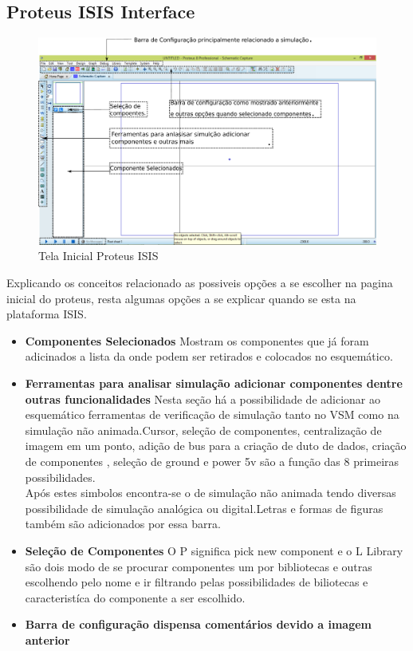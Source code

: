 \documentclass{Fabiano_file}
\begin{document}
 
\pagebreak

\subsection{Proteus ISIS Interface}

\begin{figure}[h!]
\centering
\includegraphics[width=1\textwidth]{tela_inicial_isis.pdf}
\caption{Tela Inicial Proteus ISIS}
\label{fig:tela_inicial_isis}
\end{figure}

Explicando os conceitos relacionado as possiveis opções a se escolher na pagina inicial do proteus, resta algumas opções a se explicar quando se esta na plataforma 
ISIS.

\begin{itemize}
 \item \textbf{Componentes Selecionados} Mostram os componentes que já foram adicinados a lista da onde podem ser retirados e colocados no esquemático.
 \item \textbf{Ferramentas para analisar simulação adicionar componentes dentre outras funcionalidades} Nesta seção há a possibilidade de adicionar ao esquemático
 ferramentas de verificação de simulação tanto no VSM como na simulação não animada.Cursor, seleção de componentes, centralização de imagem em um ponto, adição de
 bus para a criação de duto de dados, criação de componentes , seleção de ground e power 5v são a função das 8 primeiras possibilidades.\\
 Após estes simbolos encontra-se o  de simulação não animada tendo diversas possibilidade de simulação analógica ou digital.Letras e formas de figuras também 
 são adicionados por essa barra.
 \item \textbf{Seleção de Componentes} O P significa pick new component e o L Library são dois modo de se procurar componentes um por bibliotecas e outras 
 escolhendo pelo nome e ir filtrando pelas possibilidades de biliotecas e caracteristíca do componente a ser escolhido.
 \item \textbf{Barra de configuração dispensa comentários devido a imagem anterior}
\end{itemize}
\end{document}
